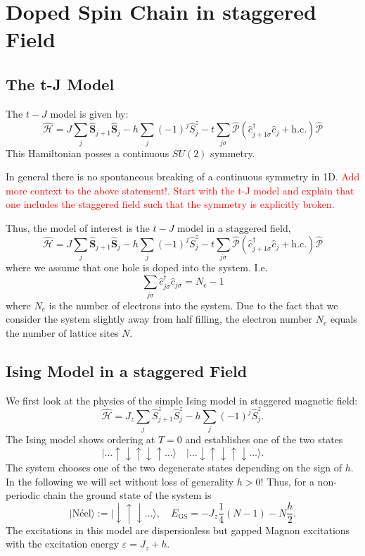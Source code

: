 \documentclass[11pt]{book}
\renewcommand{\vec}[1]{\bm{#1}}
\newcommand{\ket}[1]{|#1\rangle}
\renewcommand{\c}{\hat{c}}
\newcommand{\cd}{\hat{c}^\dagger}
\newcommand{\Svec}{\hat{\vec{S}}}
\newcommand{\Sz}{\hat{S}^z}
\renewcommand{\H}{\hat{\mathcal{H}}}
\renewcommand{\P}{\hat{\mathcal{P}}}
\newcommand{\hc}{\text{h.c.}}
\begin{document}
\chapter{Doped Spin Chain in staggered Field}\label{chapter5}

\section{The t-J Model}\label{section2.1}
The $t-J$ model is given by:
\begin{equation}
  \H = J \sum_j \Svec_{j+1}\Svec_j - h\sum_j {(-1)}^{j} \Sz_j
  -t \sum_{j\sigma} \P \left(\cd_{j+1\sigma}\c_j + \hc\right)\P
\end{equation}
This Hamiltonian posses a continuous $SU(2)$ symmetry.

In general there is no spontaneous breaking of a continuous symmetry in 1D.
\textcolor{red}{Add more context to the above statement!. Start with the t-J model and explain that one includes the staggered field such that the symmetry is explicitly broken.} 

Thus, the model of interest is the $t-J$ model in a staggered field,
\begin{equation}
  \H = J \sum_j \Svec_{j+1}\Svec_j - h\sum_j {(-1)}^{j} \Sz_j
  -t \sum_{j\sigma} \P \left(\cd_{j+1\sigma}\c_j + \hc\right)\P
\end{equation}
where we assume that one hole is doped into the system. I.e. \[ \sum_{j\sigma} \cd_{j\sigma}\c_{j\sigma} = N_e -1\] where $N_e$ is the number of electrons into the system. Due to the fact that we consider the system slightly away from half filling, the electron number $N_e$ equals the number of lattice sites $N$.


\section{Ising Model in a staggered Field}\label{section2.2}
We first look at the physics of the simple Ising model in staggered magnetic field:
\begin{equation}
  \H = J_z \sum_j \Sz_{j+1}\Sz_{j} - h \sum_j {(-1)}^{j}\Sz_j.
\end{equation}
The Ising model shows ordering at $T=0$ and establishes one of the two states \[ \ket{\dots\uparrow\downarrow\uparrow\downarrow\uparrow\dots}\quad\ket{\dots\downarrow\uparrow\downarrow\uparrow\downarrow\dots}.\] The system chooses one of the two degenerate states depending on the sign of $h$. In the following we will set without loss of generality $h>0$! Thus, for a non-periodic chain the ground state of the system is 
\begin{equation}
  \label{neel_state}
  \ket{\text{N\'eel}} := \ket{\downarrow\uparrow\downarrow\dots}, \quad E_{\text{GS}} =- J_z \frac{1}{4} \left(N-1\right) -N \frac{h}{2}.
\end{equation}
The excitations in this model are dispersionless but gapped Magnon excitations with the excitation energy $\varepsilon = J_z + h$.
\end{document}
